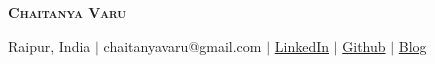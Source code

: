 \begin{center}
    \textbf{\Huge \scshape Chaitanya Varu} \\ \vspace{1pt}
    
    \small {} Raipur, India $|$ 
     chaitanyavaru@gmail.com $|$ 
    \href{https://www.linkedin.com/in/chaitanya-varu/}{ LinkedIn} $|$
    \href{https://github.com/hokageCV}{ Github} $|$  
    \href{https://chaitanya-varu-blog.netlify.app/}{ Blog} 
    
\end{center}